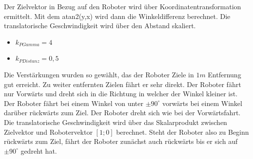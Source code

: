 Der Zielvektor in Bezug auf den Roboter wird über Koordinatentransformation ermittelt. Mit dem atan2(y,x) wird dann die Winkeldifferenz berechnet. Die translatorische Geschwindigkeit wird über den Abstand skaliert.
\begin{itemize}
	\item $k_{PGamma} = 4$
	\item $k_{PDistanz} = 0,5$
\end{itemize}
Die Verstärkungen wurden so gewählt, das der Roboter Ziele in $1m$ Entfernung gut erreicht. Zu weiter entfernten Zielen fährt er sehr direkt.
Der Roboter fährt nur Vorwärts und dreht sich in die Richtung in welcher der Winkel kleiner ist.
Der Roboter fährt bei einem Winkel von unter $\pm90^{\circ}$ vorwärts bei einem Winkel darüber rückwärts zum Ziel.
Der Roboter dreht sich wie bei der Vorwärtsfahrt. Die translatorische Geschwindigkeit wird über das Skalarprodukt zwischen Zielvektor und Robotervektor $[1;0]$ berechnet. Steht der Roboter also zu Beginn rückwärts zum Ziel, fährt der Roboter zunächst auch rückwärts bis er sich auf $\pm90^{\circ}$ gedreht hat.


\newpage
